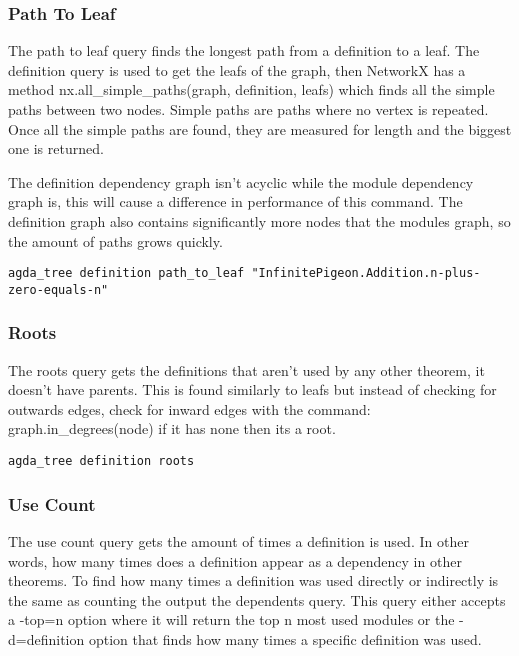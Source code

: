 \subsubsection{Path To Leaf}

The path to leaf query finds the longest path from a definition to a leaf. The
definition query is used to get the leafs of the graph, then NetworkX has a
method \textsf{nx.all\_simple\_paths(graph, definition, leafs)} which finds all
the simple paths between two nodes. Simple paths are paths where no vertex is
repeated. Once all the simple paths are found, they are measured for length and
the biggest one is returned.

The definition dependency graph isn't acyclic while the module dependency graph
is, this will cause a difference in performance of this command. The definition
graph also contains significantly more nodes that the modules graph, so the
amount of paths grows quickly.

\begin{lstlisting}
agda_tree definition path_to_leaf "InfinitePigeon.Addition.n-plus-zero-equals-n"
\end{lstlisting}

\subsubsection{Roots}

The roots query gets the definitions that aren't used by any other theorem, it
doesn't have parents. This is found similarly to leafs but instead of checking
for outwards edges, check for inward edges with the command:
\textsf{graph.in\_degrees(node)} if it has none then its a root.

\begin{lstlisting}
agda_tree definition roots
\end{lstlisting}

\subsubsection{Use Count}

The use count query gets the amount of times a definition is used. In other
words, how many times does a definition appear as a dependency in other
theorems. To find how many times a definition was used directly or indirectly
is the same as counting the output the dependents query. This query either
accepts a -top=n option where it will return the top n most used modules or the
-d=definition option that finds how many times a specific definition was used.

